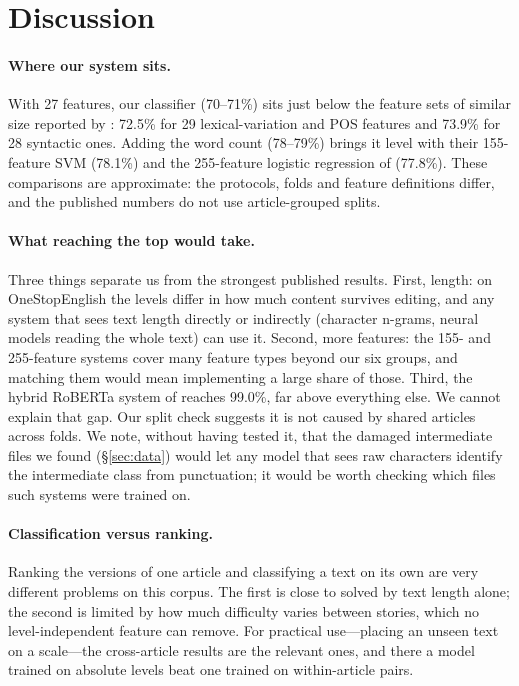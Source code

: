 \section{Discussion}

\paragraph{Where our system sits.}
With 27 features, our classifier (70--71\%) sits just below the feature sets of similar size reported by \citet{vajjala2018onestop}: 72.5\% for 29 lexical-variation and POS features and 73.9\% for 28 syntactic ones. Adding the word count (78--79\%) brings it level with their 155-feature SVM (78.1\%) and the 255-feature logistic regression of \citet{lee2021pushing} (77.8\%). These comparisons are approximate: the protocols, folds and feature definitions differ, and the published numbers do not use article-grouped splits.

\paragraph{What reaching the top would take.}
Three things separate us from the strongest published results. First, length: on OneStopEnglish the levels differ in how much content survives editing, and any system that sees text length directly or indirectly (character n-grams, neural models reading the whole text) can use it. Second, more features: the 155- and 255-feature systems cover many feature types beyond our six groups, and matching them would mean implementing a large share of those. Third, the hybrid RoBERTa system of \citet{lee2021pushing} reaches 99.0\%, far above everything else. We cannot explain that gap. Our split check suggests it is not caused by shared articles across folds. We note, without having tested it, that the damaged intermediate files we found (\S\ref{sec:data}) would let any model that sees raw characters identify the intermediate class from punctuation; it would be worth checking which files such systems were trained on.

\paragraph{Classification versus ranking.}
Ranking the versions of one article and classifying a text on its own are very different problems on this corpus. The first is close to solved by text length alone; the second is limited by how much difficulty varies between stories, which no level-independent feature can remove. For practical use---placing an unseen text on a scale---the cross-article results are the relevant ones, and there a model trained on absolute levels beat one trained on within-article pairs.

